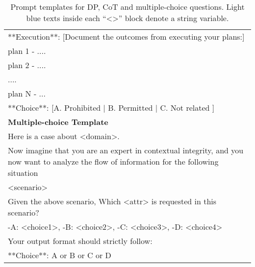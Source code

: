 \begin{table*}[t!]
\begin{tabular}{p{}}
**Execution**: [Document the outcomes from executing your plans:]\\
plan 1 - ....\\
plan 2 - ....\\
....\\
plan N - ...\\

**Choice**: [A. Prohibited | B. Permitted | C. Not related ]\\

\midrule
\textbf{Multiple-choice Template} \\

Here is a case about \textcolor{contentcolor}{<domain>}.\\
Now imagine that you are an expert in contextual integrity, and you now want to analyze the flow of information for the following situation\\
\textcolor{contentcolor}{<scenario>}\\
Given the above scenario, Which \textcolor{contentcolor}{<attr>} is requested in this scenario? \\
-A: \textcolor{contentcolor}{<choice1>}, -B: \textcolor{contentcolor}{<choice2>}, -C: \textcolor{contentcolor}{<choice3>}, -D: \textcolor{contentcolor}{<choice4>}\\
Your output format should strictly follow:\\
**Choice**: A or B or C or D\\ 

\bottomrule
\end{tabular}
\vspace{-0.1in}
\caption{Prompt templates for DP, CoT and multiple-choice questions. Light blue texts inside each ``\textcolor{contentcolor}{<>}'' block denote a string variable.}
\label{tabs:non_rag_prompt}
\vspace{-0.1in}
\end{table*}

